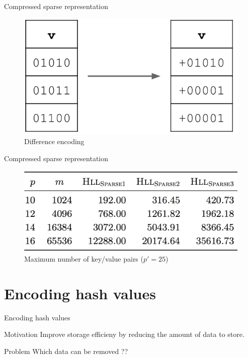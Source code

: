 \documentclass{beamer}
\begin{document}
\begin{frame}{Compressed sparse representation}

  \begin{figure}[c]
    \includegraphics [scale=0.5]  {hyperloglog_difference.png}
    \caption{Difference encoding}
  \end{figure}


\end{frame}

\begin{frame}{Compressed sparse representation}

  \begin{figure}[c]
    \includegraphics [scale=0.45]  {sparse123.png}
    \caption{Maximum number of key/value pairs ($p' = 25$)}
  \end{figure}

\end{frame}


\section{Encoding hash values}
\begin{frame}{Encoding hash values}

  \begin{block}{Motivation}
    Improve storage efficieny by reducing the amount of data to store.
  \end{block}

  \begin{alertblock}{Problem}
    Which data can be removed ??
  \end{alertblock}

\end{frame}
\end{document}
